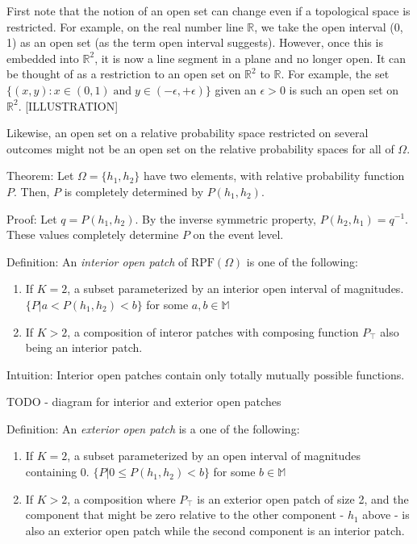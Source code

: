 \documentclass[twoside]{article}
\theoremstyle{plain}%
\theoremstyle{definition}
\theoremstyle{remark}
\begin{document}
First note that the notion of an open set can change even if a topological space is restricted. For example, on the real number line \(\mathbb{R}\), we take the open interval (0, 1) as an open set (as the term open interval suggests). However, once this is embedded into \(\mathbb{R}^2\), it is now a line segment in a plane and no longer open. It can be thought of as a restriction to an open set on \(\mathbb{R}^2\) to \(\mathbb{R}\). For example, the set \(\{(x, y): x \in (0, 1)\;  \text{and}\;  y \in (-\epsilon, +\epsilon)\}\) given an \(\epsilon > 0\) is such an open set on \(\mathbb{R}^2\). [ILLUSTRATION]

Likewise, an open set on a relative probability space restricted on several outcomes might not be an open set on the relative probability spaces for all of \(\Omega\).

Theorem: Let \(\Omega = \{h_1, h_2\}\) have two elements, with relative probability function \(P\). Then, \(P\) is completely determined by \(P(h_1, h_2)\).

Proof: Let \(q = P(h_1, h_2)\). By the inverse symmetric property, \(P(h_2, h_1) = q^{-1}\). These values completely determine \(P\) on the event level.

Definition: An \textit{interior open patch} of \(\text{RPF}(\Omega)\) is one of the following:

\begin{enumerate}
  \item If \(K = 2\), a subset parameterized by an interior open interval of magnitudes. \(\{P | a < P(h_1, h_2) < b\}\) for some \(a, b \in \mathbb{M}\) 
  \item If \(K > 2\), a composition of interor patches with composing function \(P_{\top}\) also being an interior patch.
\end{enumerate}

Intuition: Interior open patches contain only totally mutually possible functions.

TODO - diagram for interior and exterior open patches

Definition: An \textit{exterior open patch} is a one of the following:

\begin{enumerate}
  \item If \(K = 2\), a subset parameterized by an open interval of magnitudes containing 0. \(\{P | 0 \leq P(h_1, h_2) < b\}\) for some \(b \in \mathbb{M}\) 
  \item If \(K > 2\), a composition where \(P_{\top}\) is an exterior open patch of size 2, and the component that might be zero relative to the other component - \(h_1\) above - is also an exterior open patch while the second component is an interior patch.
\end{enumerate}
\end{document}
